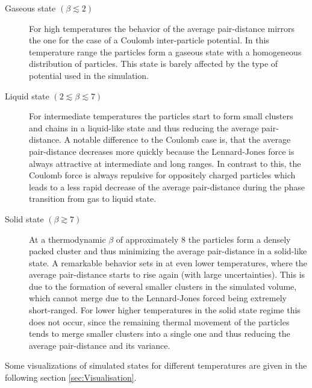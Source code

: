 \documentclass[11pt, a4paper]{article}
\numberwithin{equation}{section}
\begin{document}
\begin{description}
	\item[Gaseous state $(\beta \lesssim 2)$]
		For high temperatures the behavior of the average pair-distance mirrors the one for the case of a Coulomb inter-particle potential.
		In this temperature range the particles form a gaseous state with a homogeneous distribution of particles.
		This state is barely affected by the type of potential used in the simulation.
	
	\item[Liquid state $(2 \lesssim \beta \lesssim 7)$]
		For intermediate temperatures the particles start to form small clusters and chains in a liquid-like state and thus reducing the average pair-distance.
		A notable difference to the Coulomb case is, that the average pair-distance decreases more quickly because the Lennard-Jones force is always attractive at intermediate and long ranges.
		In contrast to this, the Coulomb force is always repulsive for oppositely charged particles which leads to a less rapid decrease of the average pair-distance during the phase transition from gas to liquid state.		
	
	\item[Solid state $(\beta \gtrsim 7)$]
		At a thermodynamic $\beta$ of approximately 8 the particles form a densely packed cluster and thus minimizing the average pair-distance in a solid-like state.
		A remarkable behavior sets in at even lower temperatures, where the average pair-distance starts to rise again (with large uncertainties).
		This is due to the formation of several smaller clusters in the simulated volume, which cannot merge due to the Lennard-Jones forced being extremely short-ranged.
		For lower higher temperatures in the solid state regime this does not occur, since the remaining thermal movement of the particles tends to merge smaller clusters into a single one and thus reducing the average pair-distance and its variance.	
\end{description}
Some visualizations of simulated states for different temperatures are given in the following section \ref{sec:Visualisation}.
\end{document}
